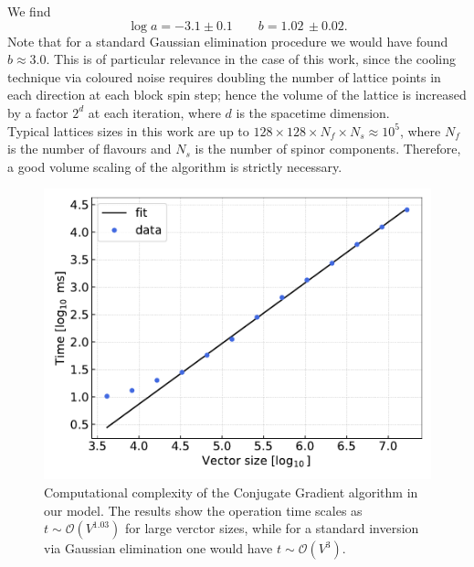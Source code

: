 We find 
\begin{equation*}
    \log a = -3.1 \pm 0.1 \qquad b = 1.02 \, \pm 0.02.
\end{equation*}
Note that for a standard Gaussian elimination procedure we would have found $b \approx 3.0$. This is of particular relevance in the case of this work, since the cooling technique via coloured noise requires doubling the number of lattice points in each direction at each block spin step; hence the volume of the lattice is increased by a factor $2^d$ at each iteration, where $d$ is the spacetime dimension. \\
Typical lattices sizes in this work are up to $128 \times 128 \times N_f \times N_s \approx 10^5$, where $N_f$ is the number of flavours and $N_s$ is the number of spinor components. Therefore, a good volume scaling of the algorithm is strictly necessary.
\begin{figure}[t]
    \centering
    \includegraphics[scale=0.65]{figures/complexity.pdf}
    \caption[Computational complexity of the Conjugate Gradient algorithm.]{Computational complexity of the Conjugate Gradient algorithm in our model. The results show the operation time scales as $t \sim \mathcal{O}(V^{1.03})$ for large verctor sizes, while for a standard inversion via Gaussian elimination one would have $t \sim \mathcal{O}(V^3)$.}
    \label{fig:complexity}
\end{figure}

